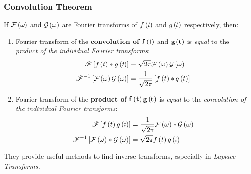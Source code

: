 \subsubsection{Convolution Theorem}
If $\mathcal{F}\left(\omega\right)$ and $\mathcal{G}\left(\omega\right)$ are Fourier transforms of $f\left(t\right)$ and $g\left(t\right)$ respectively, then:
\begin{enumerate}
    \item Fourier transform of the \textbf{convolution of} $\mathbf{f\left(t\right)}$ and $\mathbf{g\left(t\right)}$ is \textit{equal} to the \textit{product of the individual Fourier transforms}:
    \begin{align}
        \mathscr{F}\left[f\left(t\right)*g\left(t\right)\right]&=\sqrt{2\pi}\mathcal{F}\left(\omega\right)\mathcal{G}\left(\omega\right)\\
        \mathscr{F}^{-1}\left[\mathcal{F}\left(\omega\right)\mathcal{G}\left(\omega\right)\right]&=\frac{1}{\sqrt{2\pi}}\left[f\left(t\right)*g\left(t\right)\right]
    \end{align}
    \item Fourier transform of the \textbf{product of} $\mathbf{f\left(t\right)g\left(t\right)}$ is \textit{equal} to the \textit{convolution of the individual Fourier transforms}:
    \begin{align}
        \mathscr{F}\left[f\left(t\right)g\left(t\right)\right]&=\frac{1}{\sqrt{2\pi}}\mathcal{F}\left(\omega\right)*\mathcal{G}\left(\omega\right)\\
        \mathscr{F}^{-1}\left[\mathcal{F}\left(\omega\right)*\mathcal{G}\left(\omega\right)\right]&=\sqrt{2\pi}f\left(t\right)g\left(t\right)
    \end{align}
\end{enumerate}
They provide useful methods to find inverse transforms, especially in \textit{Laplace Transforms.}
